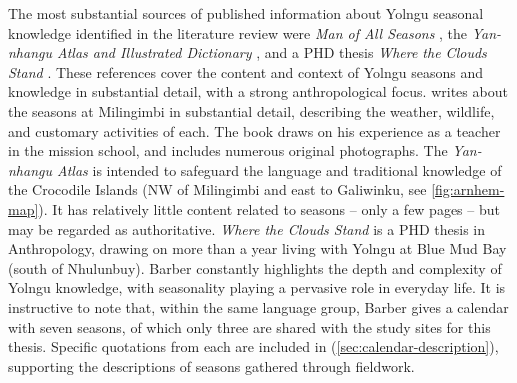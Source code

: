 The most substantial sources of published information about Yolngu seasonal
knowledge identified in the literature review were \textit{Man of All Seasons}
\citep{davis1989}, the \textit{Yan-nhangu Atlas and Illustrated Dictionary}
\citep{atlas2014}, and a PHD thesis \textit{Where the Clouds Stand} \citep{barber2005}.
These references cover the content and context of Yolngu seasons and knowledge
in substantial detail, with a strong anthropological focus.
%
\citet{davis1989} writes about the seasons at Milingimbi in substantial detail,
describing the weather, wildlife, and customary activities of each.  The book
draws on his experience as a teacher in the mission school, and includes
numerous original photographs.
%
The \textit{Yan-nhangu Atlas} is intended to safeguard the language and
traditional knowledge of the Crocodile Islands (NW of Milingimbi and east
to Galiwinku, see \cref{fig:arnhem-map}).  It has relatively little content
related to seasons -- only a few pages -- but may be regarded as authoritative.
%
\textit{Where the Clouds Stand} is a PHD thesis in Anthropology, drawing on
more than a year living with Yolngu at Blue Mud Bay (south of Nhulunbuy).
Barber constantly highlights the depth and complexity of Yolngu knowledge,
with seasonality playing a pervasive role in everyday life.  It is instructive
to note that, within the same language group, Barber gives a calendar with
seven seasons, of which only three are shared with the study sites for this
thesis.
%
Specific quotations from each are included in 
(\cref{sec:calendar-description}), supporting the descriptions of seasons
gathered through fieldwork.

